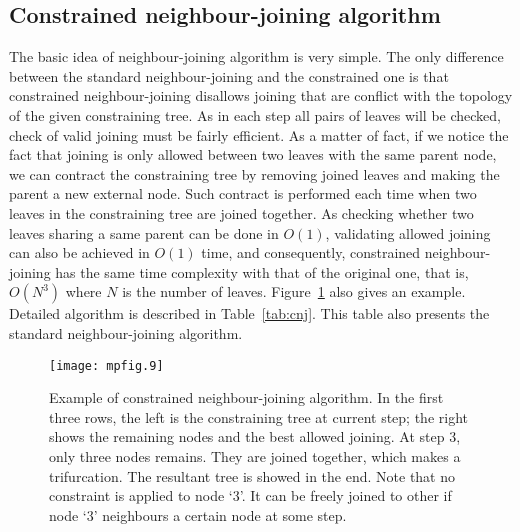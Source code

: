 \subsection{Constrained neighbour-joining algorithm}
The basic idea of neighbour-joining algorithm is very simple. The only difference between
the standard neighbour-joining and the constrained one is that
constrained neighbour-joining disallows joining that are conflict with the topology of
the given constraining tree. As in each step all pairs of leaves will be checked, check of valid
joining must be fairly efficient. As a matter of fact, if we notice the fact that joining
is only allowed between two leaves with the same parent node,
we can contract the constraining tree by removing joined leaves and making the parent a new
external node. Such contract is performed each time when two leaves in the constraining tree
are joined together. As checking whether two leaves sharing a same parent
can be done in $O(1)$, validating allowed joining can also be achieved in $O(1)$ time, and consequently,
constrained neighbour-joining has the same time complexity with that of the original one,
that is, $O(N^3)$ where $N$ is the number of leaves.
Figure~\ref{fig:example-cnj} also gives an example.
Detailed algorithm is described in Table~\ref{tab:cnj}. This table also
presents the standard neighbour-joining algorithm.

\begin{figure}[!hb]
\begin{center}
\texttt{[image: mpfig.9]}
\caption[Example of constrained neighbour-joining algorithm]
{Example of constrained neighbour-joining algorithm. In the first three rows, the left is the
constraining tree at current step; the right shows the remaining nodes and the best allowed joining.
At step 3, only three nodes remains. They are joined together, which makes a trifurcation. The resultant
tree is showed in the end. Note that no constraint is applied to node `3'. It can be freely joined to other
if node `3' neighbours a certain node at some step.}\label{fig:example-cnj}
\end{center}
\end{figure}

